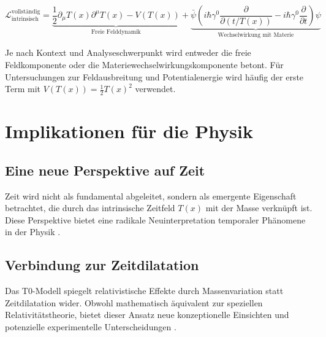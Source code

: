 \documentclass[12pt,a4paper]{article}
\newcommand{\Tfield}{T(x)}
\begin{document}
\begin{equation}
	\mathcal{L}_{\text{intrinsisch}}^{\text{vollständig}} = \underbrace{\frac{1}{2} \partial_\mu \Tfield \partial^\mu \Tfield - V(\Tfield)}_{\text{Freie Felddynamik}} + \underbrace{\bar{\psi} \left( i\hbar \gamma^0 \frac{\partial}{\partial (t/\Tfield)} - i\hbar \gamma^0 \frac{\partial}{\partial t} \right) \psi}_{\text{Wechselwirkung mit Materie}}
\end{equation}

Je nach Kontext und Analyseschwerpunkt wird entweder die freie Feldkomponente oder die Materiewechselwirkungskomponente betont. Für Untersuchungen zur Feldausbreitung und Potentialenergie wird häufig der erste Term mit $V(\Tfield) = \frac{1}{2}\Tfield^2$ verwendet.
	
	\section{Implikationen für die Physik}
	\subsection{Eine neue Perspektive auf Zeit}
	Zeit wird nicht als fundamental abgeleitet, sondern als emergente Eigenschaft betrachtet, die durch das intrinsische Zeitfeld \(\Tfield\) mit der Masse verknüpft ist. Diese Perspektive bietet eine radikale Neuinterpretation temporaler Phänomene in der Physik \cite{pascher_zeit_masse_2025}.
	
	\subsection{Verbindung zur Zeitdilatation}
	Das T0-Modell spiegelt relativistische Effekte durch Massenvariation statt Zeitdilatation wider. Obwohl mathematisch äquivalent zur speziellen Relativitätstheorie, bietet dieser Ansatz neue konzeptionelle Einsichten und potenzielle experimentelle Unterscheidungen \cite{pascher_messdifferenzen_2025}.
	
\end{document}
